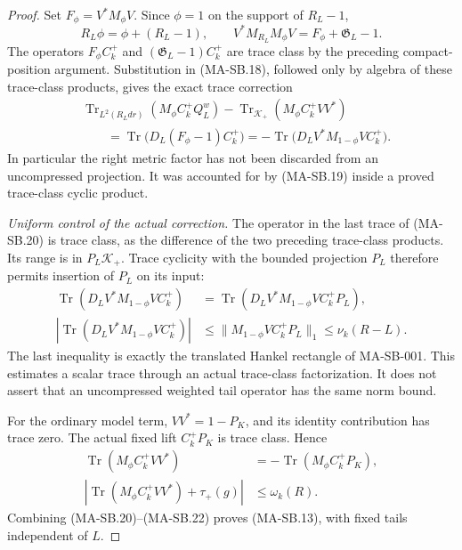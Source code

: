 \begin{proof}
Set $F_\phi=V^*M_\phi V$.
Since $\phi=1$ on the support of $R_L-1$,
\[
         R_L\phi=\phi+(R_L-1),\qquad
         V^*M_{R_L}M_\phi V
                           =F_\phi+\mathfrak G_L-1 .
 \tag{MA-SB.19}
\]
The operators $F_\phi C_k^+$ and
$(\mathfrak G_L-1)C_k^+$ are trace class by
the preceding compact-position argument.
Substitution in (MA-SB.18), followed only by
algebra of these trace-class products, gives
the exact trace correction
\[
 \begin{split}
 &\operatorname{Tr}_{L^2(R_Ldr)}(M_\phi C_k^+Q_L^w)
       -\operatorname{Tr}_{\mathcal K_+}
                                (M_\phi C_k^+VV^*)\\
 &\qquad=\operatorname{Tr}
             \bigl(D_L(F_\phi-1)C_k^+\bigr)
       =-\operatorname{Tr}
             \bigl(D_LV^*M_{1-\phi}VC_k^+\bigr).
 \end{split}
 \tag{MA-SB.20}
\]
In particular the right metric factor has not
been discarded from an uncompressed projection.
It was accounted for by (MA-SB.19) inside a
proved trace-class cyclic product.

\emph{Uniform control of the actual correction.}
The operator in the last trace of (MA-SB.20)
is trace class, as the difference of the
two preceding trace-class products.
Its range is in $P_L\mathcal K_+$.
Trace cyclicity with the bounded projection
$P_L$ therefore permits insertion of $P_L$
on its input:
\[
 \begin{split}
 \operatorname{Tr}
    (D_LV^*M_{1-\phi}VC_k^+)
 &=\operatorname{Tr}
    (D_LV^*M_{1-\phi}VC_k^+P_L),\\
 \left|\operatorname{Tr}
    (D_LV^*M_{1-\phi}VC_k^+)\right|
 &\le\|M_{1-\phi}VC_k^+P_L\|_1
 \le\nu_k(R-L).
 \end{split}
 \tag{MA-SB.21}
\]
The last inequality is exactly the translated
Hankel rectangle of MA-SB-001.
This estimates a scalar trace through an actual
trace-class factorization.  It does not assert
that an uncompressed weighted tail operator
has the same norm bound.

For the ordinary model term, $VV^*=1-P_K$,
and its identity contribution has trace zero.
The actual fixed lift $C_k^+P_K$ is trace class.
Hence
\[
 \begin{split}
 \operatorname{Tr}(M_\phi C_k^+VV^*)
 &=-\operatorname{Tr}(M_\phi C_k^+P_K),\\
 \left|\operatorname{Tr}(M_\phi C_k^+VV^*)+\tau_+(g)\right|
 &\le\omega_k(R).
 \end{split}
 \tag{MA-SB.22}
\]
Combining (MA-SB.20)--(MA-SB.22) proves
(MA-SB.13), with fixed tails independent of $L$.


\end{proof}
